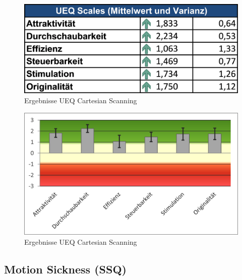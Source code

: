 \begin{figure}[tbh]
    \centering
   \includegraphics{images/Results/UEQ-Table-Means-Cartesian.png}
    \caption{Ergebnisse UEQ Cartesian Scanning}
    \label{fig:ueqScalesCartesian}
   \end{figure}

\begin{figure}[tbh]
 \centering
\includegraphics{images/Results/UEQ-Cartesian.png}
 \caption{Ergebnisse UEQ Cartesian Scanning}
 \label{fig:ueqScoreCartesian}
\end{figure}


\subsection{Motion Sickness (SSQ)} 

